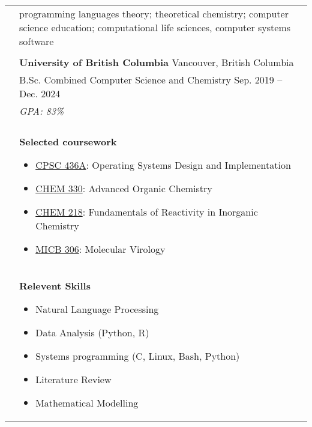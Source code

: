 \documentclass[letterpaper, 11pt]{article}
\begin{document}

\vspace{0.5cm} 


\setlength{\tabcolsep}{8pt}

\begin{longtable}{p{1.3in}p{4.8in}}

\nohyphens{\color{Blue}{Research Interests}}
& programming languages theory; theoretical chemistry; computer science education; computational life sciences, computer systems software \\
& \\

\color{Blue}{Education} 
& \textbf{University of British Columbia} \hfill Vancouver, British Columbia \\
& B.Sc. Combined Computer Science and Chemistry \hfill Sep. 2019 -- Dec. 2024 \\
& {\it GPA: 83\%} \\
& \\

& \textbf{Selected coursework}
\begin{itemize}[noitemsep,leftmargin=*]
\item \underline{CPSC 436A}: Operating Systems Design and Implementation
\item \underline{CHEM 330}: Advanced Organic Chemistry
\item \underline{CHEM 218}: Fundamentals of Reactivity in Inorganic Chemistry
\item \underline{MICB 306}: Molecular Virology
\end{itemize} \\

& \textbf{Relevent Skills}
\begin{itemize}[noitemsep,leftmargin=*]
\item Natural Language Processing
\item Data Analysis (Python, R)
\item Systems programming (C, Linux, Bash, Python)
\item Literature Review
\item Mathematical Modelling
\end{itemize} \\


\end{longtable}
\end{document}
